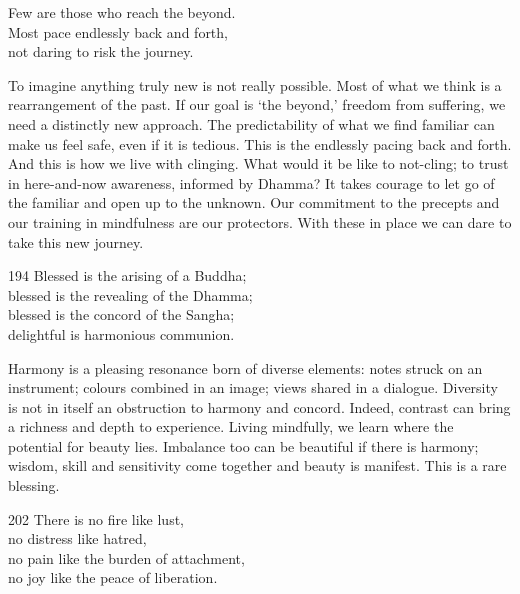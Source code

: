 

\begin{dhpVerse}{85}
\label{dhp-85}
Few are those who reach the beyond.\\
Most pace endlessly back and forth,\\
not daring to risk the journey.
\end{dhpVerse}

\begin{dhpRefl}
To imagine anything truly new is not really possible. Most of what we think is a rearrangement of the past. If our goal is `the beyond,' freedom from suffering, we need a distinctly new approach. The predictability of what we find familiar can make us feel safe, even if it is tedious. This is the endlessly pacing back and forth. And this is how we live with clinging. What would it be like to not-cling; to trust in here-and-now awareness, informed by Dhamma? It takes courage to let go of the familiar and open up to the unknown. Our commitment to the precepts and our training in mindfulness are our protectors. With these in place we can dare to take this new journey.
\end{dhpRefl}


\begin{dhpVerse}{194}
\label{dhp-194}
Blessed is the arising of a Buddha;\\
blessed is the revealing of the Dhamma;\\
blessed is the concord of the Sangha;\\
delightful is harmonious communion.
\end{dhpVerse}

\begin{dhpRefl}
Harmony is a pleasing resonance born of diverse elements: notes struck on an instrument; colours combined in an image; views shared in a dialogue. Diversity is not in itself an obstruction to harmony and concord. Indeed, contrast can bring a richness and depth to experience. Living mindfully, we learn where the potential for beauty lies. Imbalance too can be beautiful if there is harmony; wisdom, skill and sensitivity come together and beauty is manifest. This is a rare blessing.
\end{dhpRefl}


\begin{dhpVerse}{202}
\label{dhp-202}
There is no fire like lust,\\
no distress like hatred,\\
no pain like the burden of attachment,\\
no joy like the peace of liberation.
\end{dhpVerse}

